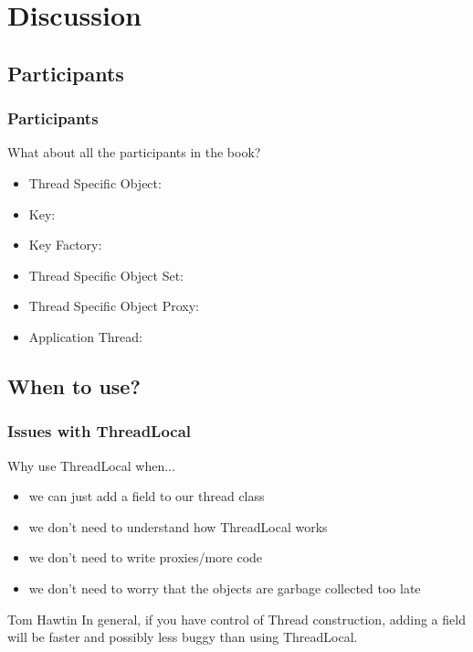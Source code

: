 \documentclass{beamer}
\begin{document}
\section{Discussion}

\subsection{Participants}

\begin{frame}
  \frametitle{Participants}

What about all the participants in the book?
\begin{itemize}
\item Thread Specific Object: 
\item Key: 
\item Key Factory: 
\item Thread Specific Object Set: 
\item Thread Specific Object Proxy: 
\item Application Thread: 
\end{itemize}

\end{frame}

\subsection{When to use?}

\begin{frame}
  \frametitle{Issues with ThreadLocal}

Why use ThreadLocal when...
\begin{itemize}
\item we can just add a field to our thread class
\item we don't need to understand how ThreadLocal works
\item we don't need to write proxies/more code
\item we don't need to worry that the objects are garbage collected too late
\end{itemize}

\pause

\begin{block}{Tom Hawtin}
In general, if you have control of Thread construction, adding a field will be faster and possibly less buggy than using ThreadLocal.
\end{block}

\end{frame}
\end{document}
